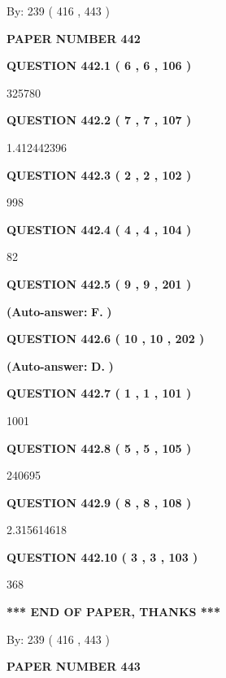 \documentclass{ctexart}
\begin{document}
   
\hspace{1.0in} By: 
 239 ( 416 ,  443 )
   
   
   
   
\newpage 
\setcounter{page}{ 
   442001 } 
   
   
 {\textbf{ \Large{ PAPER NUMBER  442  }}}
   
   
   
   
  
  
{\textbf{\large{QUESTION
442.1 
 ( 6 , 6 , 106 )
}}}

325780
  
  
{\textbf{\large{QUESTION
442.2 
 ( 7 , 7 , 107 )
}}}

1.412442396
  
  
{\textbf{\large{QUESTION
442.3 
 ( 2 , 2 , 102 )
}}}

998
  
  
{\textbf{\large{QUESTION
442.4 
 ( 4 , 4 , 104 )
}}}

82
  
  
{\textbf{\large{QUESTION
442.5 
 ( 9 , 9 , 201 )
}}}
 
 
{\textbf{(Auto-answer:}}
{\textbf{\large{
F.}}}
{\textbf{)}}
 
 
  
  
{\textbf{\large{QUESTION
442.6 
 ( 10 , 10 , 202 )
}}}
 
 
{\textbf{(Auto-answer:}}
{\textbf{\large{
D.}}}
{\textbf{)}}
 
 
  
  
{\textbf{\large{QUESTION
442.7 
 ( 1 , 1 , 101 )
}}}

1001
  
  
{\textbf{\large{QUESTION
442.8 
 ( 5 , 5 , 105 )
}}}

240695
  
  
{\textbf{\large{QUESTION
442.9 
 ( 8 , 8 , 108 )
}}}

2.315614618
  
  
{\textbf{\large{QUESTION
442.10 
 ( 3 , 3 , 103 )
}}}

368
   
   
   
   
\vspace{1.0in} 
{\textbf{\large{ *** END OF PAPER, THANKS *** }}} 
   
   
\hspace{1.0in} By: 
 239 ( 416 ,  443 )
   
   
   
   
\newpage 
\setcounter{page}{ 
   443001 } 
   
   
 {\textbf{ \Large{ PAPER NUMBER  443  }}}
   
\end{document}
